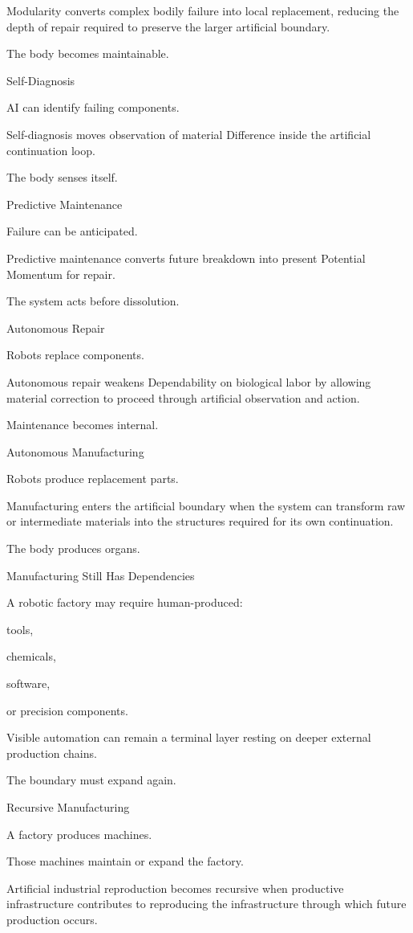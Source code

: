 Modularity converts complex bodily failure into local replacement, reducing the depth of repair required to preserve the larger artificial boundary.

The body becomes maintainable.

Self-Diagnosis

AI can identify failing components.

Self-diagnosis moves observation of material Difference inside the artificial continuation loop.

The body senses itself.

Predictive Maintenance

Failure can be anticipated.

Predictive maintenance converts future breakdown into present Potential Momentum for repair.

The system acts before dissolution.

Autonomous Repair

Robots replace components.

Autonomous repair weakens Dependability on biological labor by allowing material correction to proceed through artificial observation and action.

Maintenance becomes internal.

Autonomous Manufacturing

Robots produce replacement parts.

Manufacturing enters the artificial boundary when the system can transform raw or intermediate materials into the structures required for its own continuation.

The body produces organs.

Manufacturing Still Has Dependencies

A robotic factory may require human-produced:

tools,

chemicals,

software,

or precision components.

Visible automation can remain a terminal layer resting on deeper external production chains.

The boundary must expand again.

Recursive Manufacturing

A factory produces machines.

Those machines maintain or expand the factory.

Artificial industrial reproduction becomes recursive when productive infrastructure contributes to reproducing the infrastructure through which future production occurs.

